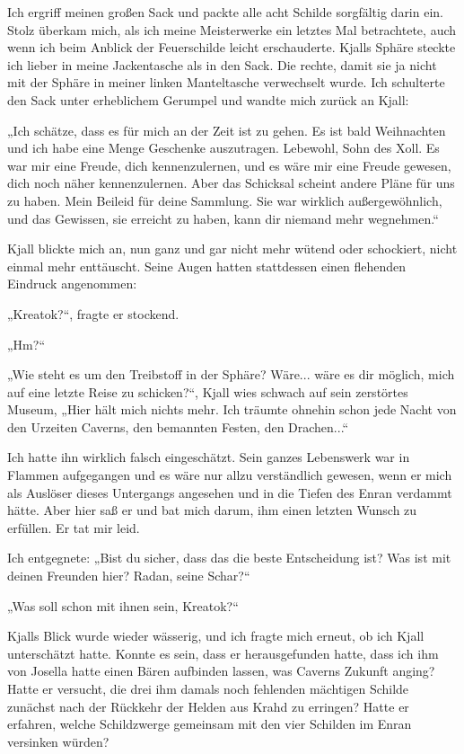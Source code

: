 \documentclass[10pt, a4paper, oneside]{book}
\begin{document}
Ich ergriff meinen großen Sack und packte alle acht Schilde sorgfältig darin ein. Stolz überkam mich, als ich meine Meisterwerke ein letztes Mal betrachtete, auch wenn ich beim Anblick der Feuerschilde leicht erschauderte. Kjalls Sphäre steckte ich lieber in meine Jackentasche als in den Sack. Die rechte, damit sie ja nicht mit der Sphäre in meiner linken Manteltasche verwechselt wurde. Ich schulterte den Sack unter erheblichem Gerumpel und wandte mich zurück an Kjall:

„Ich schätze, dass es für mich an der Zeit ist zu gehen. Es ist bald Weihnachten und ich habe eine Menge Geschenke auszutragen. Lebewohl, Sohn des Xoll. Es war mir eine Freude, dich kennenzulernen, und es wäre mir eine Freude gewesen, dich noch näher kennenzulernen. Aber das Schicksal scheint andere Pläne für uns zu haben. Mein Beileid für deine Sammlung. Sie war wirklich außergewöhnlich, und das Gewissen, sie erreicht zu haben, kann dir niemand mehr wegnehmen.“

Kjall blickte mich an, nun ganz und gar nicht mehr wütend oder schockiert, nicht einmal mehr enttäuscht. Seine Augen hatten stattdessen einen flehenden Eindruck angenommen:

„Kreatok?“, fragte er stockend.

„Hm?“

„Wie steht es um den Treibstoff in der Sphäre? Wäre... wäre es dir möglich, mich auf eine letzte Reise zu schicken?“, Kjall wies schwach auf sein zerstörtes Museum, „Hier hält mich nichts mehr. Ich träumte ohnehin schon jede Nacht von den Urzeiten Caverns, den bemannten Festen, den Drachen...“

Ich hatte ihn wirklich falsch eingeschätzt. Sein ganzes Lebenswerk war in Flammen aufgegangen und es wäre nur allzu verständlich gewesen, wenn er mich als Auslöser dieses Untergangs angesehen und in die Tiefen des Enran verdammt hätte. Aber hier saß er und bat mich darum, ihm einen letzten Wunsch zu erfüllen. Er tat mir leid.

Ich entgegnete: „Bist du sicher, dass das die beste Entscheidung ist? Was ist mit deinen Freunden hier? Radan, seine Schar?“

„Was soll schon mit ihnen sein, Kreatok?“

Kjalls Blick wurde wieder wässerig, und ich fragte mich erneut, ob ich Kjall unterschätzt hatte. Konnte es sein, dass er herausgefunden hatte, dass ich ihm von Josella hatte einen Bären aufbinden lassen, was Caverns Zukunft anging? Hatte er versucht, die drei ihm damals noch fehlenden mächtigen Schilde zunächst nach der Rückkehr der Helden aus Krahd zu erringen? Hatte er erfahren, welche Schildzwerge gemeinsam mit den vier Schilden im Enran versinken würden?
\end{document}
